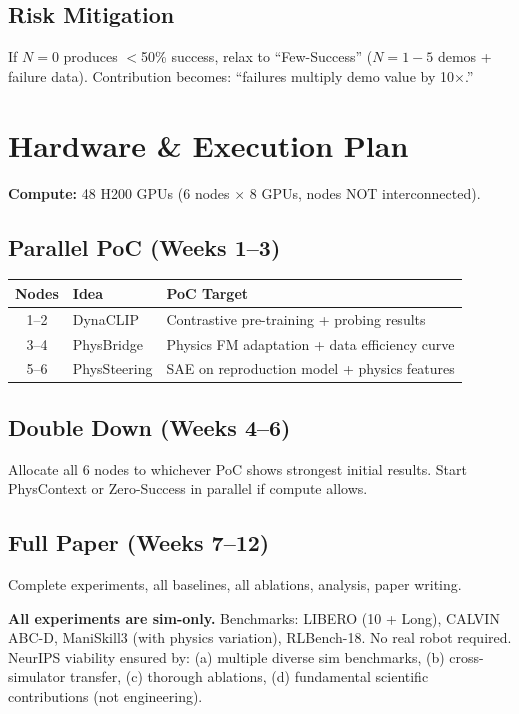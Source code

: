 \documentclass[11pt,a4paper]{article}
\begin{document}
\subsection{Risk Mitigation}
If $N{=}0$ produces $<$50\% success, relax to ``Few-Success'' ($N{=}1{-}5$ demos + failure data). Contribution becomes: ``failures multiply demo value by 10$\times$.''

\newpage
\section{Hardware \& Execution Plan}
\label{sec:hardware}

\textbf{Compute:} 48 H200 GPUs (6 nodes $\times$ 8 GPUs, nodes NOT interconnected).

\subsection{Parallel PoC (Weeks 1--3)}
\begin{table}[h]
\centering
\begin{tabular}{cll}
\toprule
\textbf{Nodes} & \textbf{Idea} & \textbf{PoC Target} \\
\midrule
1--2 & DynaCLIP & Contrastive pre-training + probing results \\
3--4 & PhysBridge & Physics FM adaptation + data efficiency curve \\
5--6 & PhysSteering & SAE on reproduction model + physics features \\
\bottomrule
\end{tabular}
\end{table}

\subsection{Double Down (Weeks 4--6)}
Allocate all 6 nodes to whichever PoC shows strongest initial results. Start PhysContext or Zero-Success in parallel if compute allows.

\subsection{Full Paper (Weeks 7--12)}
Complete experiments, all baselines, all ablations, analysis, paper writing.

\vspace{10pt}
\noindent\textbf{All experiments are sim-only.} Benchmarks: LIBERO (10 + Long), CALVIN ABC-D, ManiSkill3 (with physics variation), RLBench-18. No real robot required. NeurIPS viability ensured by: (a) multiple diverse sim benchmarks, (b) cross-simulator transfer, (c) thorough ablations, (d) fundamental scientific contributions (not engineering).
\end{document}
